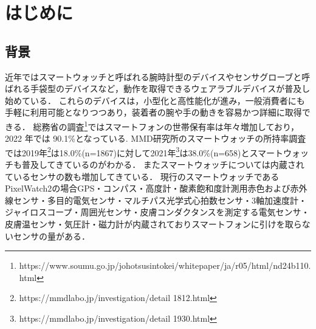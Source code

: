 \chapter{はじめに}
\section{背景}
近年ではスマートウォッチと呼ばれる腕時計型のデバイスやセンサグローブと呼ばれる手袋型のデバイスなど，動作を取得できるウェアラブルデバイスが普及し始めている．
これらのデバイスは，小型化と高性能化が進み，一般消費者にも手軽に利用可能となりつつあり，装着者の腕や手の動きを容易かつ詳細に取得できる．
総務省の調査\footnote[1]{ https://www.soumu.go.jp/johotsusintokei/whitepaper/ja/r05/html/nd24b110.html}ではスマートフォンの世帯保有率は年々増加しており，2022 年では 90.1\%となっている.
MMD研究所のスマートウォッチの所持率調査では2019年\footnote[2]{https://mmdlabo.jp/investigation/detail 1812.html}は18.0\%(n=1867)に対して2021年\footnote[3]{https://mmdlabo.jp/investigation/detail 1930.html}は38.0\%(n=658)とスマートウォッチも普及してきているのがわかる．
またスマートウォッチについては内蔵されているセンサの数も増加してきている．
現行のスマートウォッチであるPixelWatch2の場合GPS・コンパス・高度計・酸素飽和度計測用赤色および赤外線センサ・多目的電気センサ・マルチパス光学式心拍数センサ・3軸加速度計・ジャイロスコープ・周囲光センサ・皮膚コンダクタンスを測定する電気センサ・皮膚温センサ・気圧計・磁力計が内蔵されておりスマートフォンに引けを取らないセンサの量がある．


